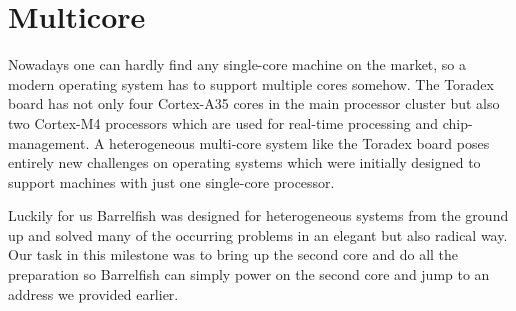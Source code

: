 \chapter{Multicore}

Nowadays one can hardly find any single-core machine on the market, so
a modern operating system has to support multiple cores somehow. The 
Toradex board has not only four Cortex-A35 cores in the main processor 
cluster but also two Cortex-M4 processors which are used for real-time 
processing and chip-management. A heterogeneous multi-core system like
the Toradex board poses entirely new challenges on operating systems 
which were initially designed to support machines with just one single-core 
processor.

Luckily for us Barrelfish was designed for heterogeneous systems from the
ground up and solved many of the occurring problems in an elegant but also
radical way. Our task in this milestone was to bring up the second core
and do all the preparation so Barrelfish can simply power on the second core
and jump to an address we provided earlier.

